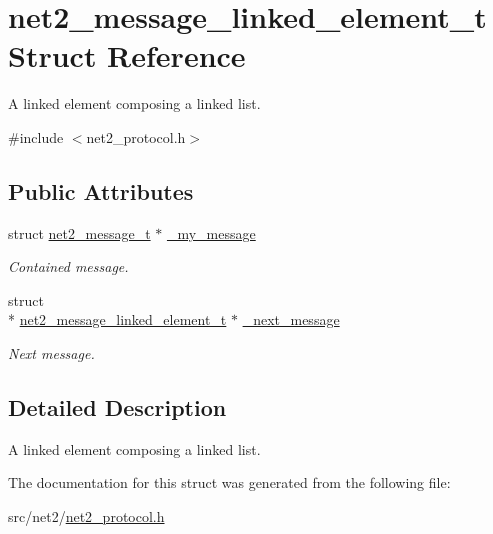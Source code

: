 \hypertarget{structnet2__message__linked__element__t}{\section{net2\-\_\-message\-\_\-linked\-\_\-element\-\_\-t Struct Reference}
\label{structnet2__message__linked__element__t}
}


A linked element composing a linked list.  




{\ttfamily \#include $<$net2\-\_\-protocol.\-h$>$}

\subsection*{Public Attributes}
\begin{DoxyCompactItemize}
\item 
\hypertarget{structnet2__message__linked__element__t_a6ef66e03a7c837615a5fc44d05e10da9}{struct \hyperlink{structnet2__message__t}{net2\-\_\-message\-\_\-t} $\ast$ \hyperlink{structnet2__message__linked__element__t_a6ef66e03a7c837615a5fc44d05e10da9}{\-\_\-my\-\_\-message}}\label{structnet2__message__linked__element__t_a6ef66e03a7c837615a5fc44d05e10da9}

\begin{DoxyCompactList}\small\item\em Contained message. \end{DoxyCompactList}\item 
\hypertarget{structnet2__message__linked__element__t_a4456c5695189635ab7db61a66a706e03}{struct \\*
\hyperlink{structnet2__message__linked__element__t}{net2\-\_\-message\-\_\-linked\-\_\-element\-\_\-t} $\ast$ \hyperlink{structnet2__message__linked__element__t_a4456c5695189635ab7db61a66a706e03}{\-\_\-next\-\_\-message}}\label{structnet2__message__linked__element__t_a4456c5695189635ab7db61a66a706e03}

\begin{DoxyCompactList}\small\item\em Next message. \end{DoxyCompactList}\end{DoxyCompactItemize}


\subsection{Detailed Description}
A linked element composing a linked list. 

The documentation for this struct was generated from the following file\-:\begin{DoxyCompactItemize}
\item 
src/net2/\hyperlink{net2__protocol_8h}{net2\-\_\-protocol.\-h}\end{DoxyCompactItemize}
